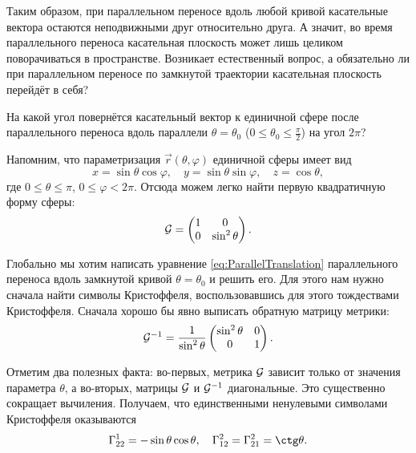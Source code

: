 Таким образом, при параллельном переносе вдоль любой кривой касательные вектора остаются неподвижными друг относительно друга. А значит, во время параллельного переноса касательная плоскость может лишь целиком поворачиваться в пространстве. Возникает естественный вопрос, а обязательно ли при параллельном переносе по замкнутой траектории касательная плоскость перейдёт в себя?

\begin{problem} \label{problem:SphereTranslation}
	На какой угол повернётся касательный вектор к единичной сфере после параллельного переноса вдоль параллели $\theta = \theta_0$ ($0 \leqslant \theta_0 \leqslant \frac{\pi}{2}$) на угол $2\pi$?
\end{problem}

\begin{firstsolution}
	Напомним, что параметризация $\vec{r}(\theta, \varphi)$ единичной сферы имеет вид
	\[
		x = \sin\theta\cos\varphi,\quad y = \sin\theta\sin\varphi,\quad z = \cos\theta,
	\]
	где $0 \leqslant \theta \leqslant \pi$, $0 \leqslant \varphi < 2\pi$. Отсюда можем легко найти первую квадратичную форму сферы:
	\[
		\mathcal{G} =
		\begin{pmatrix}
			1 & 0\\
			0 & \sin^2\theta
		\end{pmatrix}.
	\]

	Глобально мы хотим написать уравнение \eqref{eq:ParallelTranslation} параллельного переноса вдоль замкнутой кривой $\theta = \theta_0$ и решить его. Для этого нам нужно сначала найти символы Кристоффеля, воспользовавшись для этого тождествами Кристоффеля. Сначала хорошо бы явно выписать обратную матрицу метрики:
	\[
		\mathcal{G}^{-1} = \frac{1}{\sin^2\theta}
		\begin{pmatrix}
			\sin^2\theta & 0\\
			0 & 1
		\end{pmatrix}.
	\]

	Отметим два полезных факта: во-первых, метрика $\mathcal{G}$ зависит только от значения параметра $\theta$, а во-вторых, матрицы $\mathcal{G}$ и $\mathcal{G}^{-1}$ диагональные. Это существенно сокращает вычиления. Получаем, что единственными ненулевыми символами Кристоффеля оказываются
	\[
		\Gamma_{22}^1 = -\sin\theta\cos\theta,\quad \Gamma_{12}^2 = \Gamma_{21}^2 = \ctg\theta.
	\]


\end{firstsolution}

